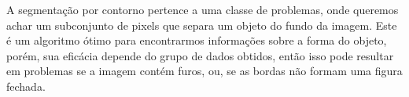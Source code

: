 \begin{question}
    A segmentação por contorno pertence a uma classe de problemas, onde queremos achar 
    um subconjunto de pixels que separa um objeto do fundo da imagem. Este é um algoritmo 
    ótimo para encontrarmos informações sobre a forma do objeto, porém, sua eficácia depende do grupo de dados obtidos, então isso pode resultar
    em problemas se a imagem contém furos, ou, se as bordas não formam uma figura fechada.
\end{question}